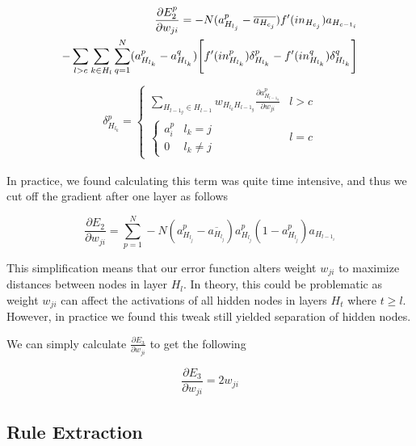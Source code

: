 \begin{align}
    \frac{\partial E_2^p}{\partial w_{ji}} =
    -N(a_{H_{l_j}}^p - \overline{a_{H_{c_j}}})f'(in_{H_{c_j}})a_{H_{c-1_i}} \notag\\
    -\sum_{l>c}\sum_{k\in H_{l}}\sum_{q=1}^N (a_{H_{l_k}}^p - a_{H_{l_k}}^q)  \Bigg[f'(in_{H_{l_k}}^p)\delta_{H_{l_k}}^p - f'(in_{H_{l_k}}^q)\delta_{H_{l_k}}^q  \Bigg]
\end{align}
\begin{align}
    \delta_{H_{l_k}}^p = 
     \begin{cases}
         \sum_{H_{l-1_{g}}\in H_{l-1}} w_{H_{l_k}H_{l-1_{g}}} \frac{\partial a_{H_{l-1_{g}}}^p}{\partial w_{ji}} & l > c \\
         \begin{cases}
            a_i^p & l_k = j \\
            0 & l_k \neq j
         \end{cases} & l = c
    \end{cases} 
\end{align}

In practice, we found calculating this term was quite time intensive, and thus
we cut off the gradient after one layer as follows

\begin{equation}
  \frac{\partial E_2}{\partial w_{ji}} = \sum_{p=1}^{N} -N(a_{H_{l_j}}^p - \overline{a_{H_{l_j}}})a_{H_{l_j}}^p(1-a_{H_{l_j}}^p)a_{H_{l-1_i}}
\end{equation}

This simplification means that our error function alters weight
$w_{ji}$ to maximize distances between nodes in layer $H_{l}$. In theory, this
could be problematic as weight $w_{ji}$ can affect the activations of all
hidden nodes in layers $H_{t}$ where $t \geq l$. However, in practice we
found this tweak still yielded separation of hidden nodes.

We can simply calculate $\frac{\partial E_3}{\partial w_{ji}}$ to get the following

\begin{equation}
  \frac{\partial E_3}{\partial w_{ji}} = 2 w_{ji}
\end{equation}

\subsection{Rule Extraction}
\label{sec:re}

